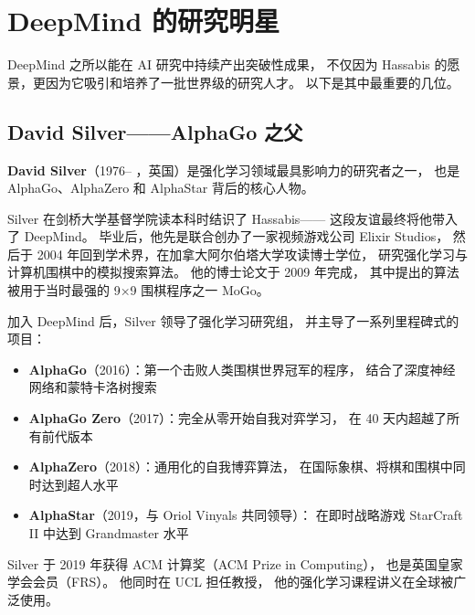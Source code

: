 \section{DeepMind 的研究明星}
\label{sec:deepmind-stars}

DeepMind 之所以能在 AI 研究中持续产出突破性成果，
不仅因为 Hassabis 的愿景，更因为它吸引和培养了一批世界级的研究人才。
以下是其中最重要的几位。


\subsection{David Silver——AlphaGo 之父}
\label{subsec:silver}

\noindent\textbf{David Silver}（1976-- ，英国）是强化学习领域最具影响力的研究者之一，
也是 AlphaGo、AlphaZero 和 AlphaStar 背后的核心人物。

Silver 在剑桥大学基督学院读本科时结识了 Hassabis——
这段友谊最终将他带入了 DeepMind。
毕业后，他先是联合创办了一家视频游戏公司 Elixir Studios，
然后于 2004 年回到学术界，在加拿大阿尔伯塔大学攻读博士学位，
研究强化学习与计算机围棋中的模拟搜索算法。
他的博士论文于 2009 年完成，
其中提出的算法被用于当时最强的 9×9 围棋程序之一 MoGo。

加入 DeepMind 后，Silver 领导了强化学习研究组，
并主导了一系列里程碑式的项目：

\begin{itemize}[noitemsep]
  \item \textbf{AlphaGo}（2016）：第一个击败人类围棋世界冠军的程序，
        结合了深度神经网络和蒙特卡洛树搜索
  \item \textbf{AlphaGo Zero}（2017）：完全从零开始自我对弈学习，
        在 40 天内超越了所有前代版本
  \item \textbf{AlphaZero}（2018）：通用化的自我博弈算法，
        在国际象棋、将棋和围棋中同时达到超人水平
  \item \textbf{AlphaStar}（2019，与 Oriol Vinyals 共同领导）：
        在即时战略游戏 StarCraft II 中达到 Grandmaster 水平
\end{itemize}

Silver 于 2019 年获得 ACM 计算奖（ACM Prize in Computing），
也是英国皇家学会会员（FRS）。
他同时在 UCL 担任教授，
他的强化学习课程讲义在全球被广泛使用。

